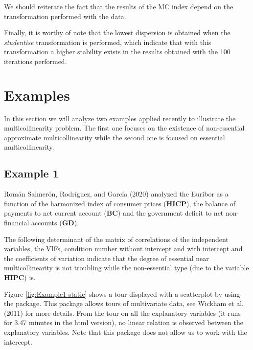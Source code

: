 We should reiterate the fact that the results of the MC index depend on the transformation performed with the data.

Finally, it is worthy of note that the lowest dispersion is obtained when the \emph{studentise} transformation is performed, which indicate that with this transformation a higher stability exists in the results obtained with the 100 iterations performed.

\hypertarget{examples}{%
\section{Examples}\label{examples}}

In this section we will analyze two examples applied recently to illustrate the multicollinearity problem. The first one focuses on the existence of non-essential approximate multicollinearity while the second one is focused on essential multicollinearity.

\hypertarget{example-1}{%
\subsection{Example 1}\label{example-1}}

Román Salmerón, Rodríguez, and García (2020) analyzed the Euribor as a function of the harmonized index of consumer prices (\textbf{HICP}), the balance of payments to net current account (\textbf{BC}) and the government deficit to net non-financial accounts (\textbf{GD}).

The following determinant of the matrix of correlations of the independent variables, the VIFs, condition number without intercept and with intercept and the coefficients of variation indicate that the degree of essential near multicollinearity is not troubling while the non-essential type (due to the variable \textbf{HIPC}) is.

Figure \ref{fig:Example1-static} shows a tour displayed with a scatterplot by using the  package. This package allows tours of multivariate data, see Wickham et al. (2011) for more details. From the tour on all the explanatory variables (it runs for 3.47 minutes in the html version), no linear relation is observed between the explanatory variables. Note that this package does not allow us to work with the intercept.


